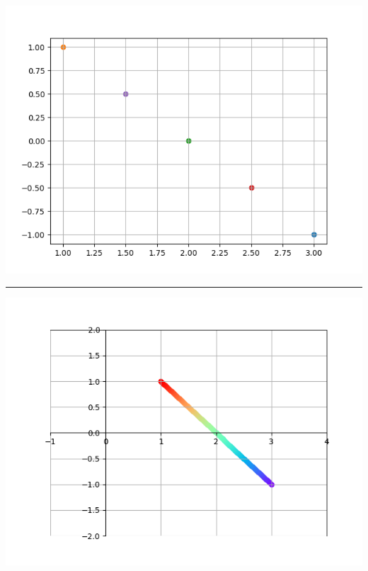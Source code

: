 \setlength\columnsep{-100pt}
\begin{multicols}{2}
	
	\columnbreak
	\centering
	\includegraphics[scale=.7]{segment.png}
\end{multicols}
\hrule
\begin{multicols}{2}
	\columnbreak
	\centering
	\includegraphics[scale=.7]{segment-ameliore.png}
\end{multicols}


